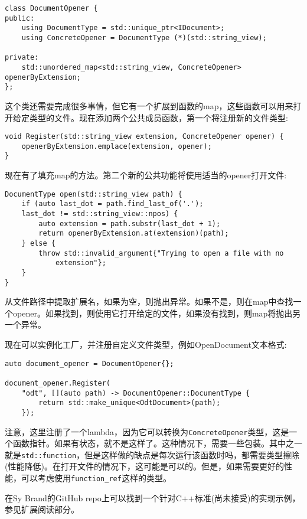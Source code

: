 \begin{lstlisting}[style=styleCXX]
class DocumentOpener {
public:
	using DocumentType = std::unique_ptr<IDocument>;
	using ConcreteOpener = DocumentType (*)(std::string_view);

private:
	std::unordered_map<std::string_view, ConcreteOpener> openerByExtension;
};
\end{lstlisting}

这个类还需要完成很多事情，但它有一个扩展到函数的map，这些函数可以用来打开给定类型的文件。现在添加两个公共成员函数，第一个将注册新的文件类型:

\begin{lstlisting}[style=styleCXX]
void Register(std::string_view extension, ConcreteOpener opener) {
	openerByExtension.emplace(extension, opener);
}
\end{lstlisting}

现在有了填充map的方法。第二个新的公共功能将使用适当的opener打开文件:

\begin{lstlisting}[style=styleCXX]
DocumentType open(std::string_view path) {
	if (auto last_dot = path.find_last_of('.');
	last_dot != std::string_view::npos) {
		auto extension = path.substr(last_dot + 1);
		return openerByExtension.at(extension)(path);
	} else {
		throw std::invalid_argument{"Trying to open a file with no
			extension"};
	}
}
\end{lstlisting}

从文件路径中提取扩展名，如果为空，则抛出异常。如果不是，则在map中查找一个opener。如果找到，则使用它打开给定的文件，如果没有找到，则map将抛出另一个异常。

现在可以实例化工厂，并注册自定义文件类型，例如OpenDocument文本格式:

\begin{lstlisting}[style=styleCXX]
auto document_opener = DocumentOpener{};

document_opener.Register(
	"odt", [](auto path) -> DocumentOpener::DocumentType {
		return std::make_unique<OdtDocument>(path);
	});
\end{lstlisting}

注意，这里注册了一个lambda，因为它可以转换为\texttt{ConcreteOpener}类型，这是一个函数指针。如果有状态，就不是这样了。这种情况下，需要一些包装。其中之一就是\texttt{std::function}，但是这样做的缺点是每次运行该函数时吗，都需要类型擦除(性能降低)。在打开文件的情况下，这可能是可以的。但是，如果需要更好的性能，可以考虑使用\texttt{function\_ref}这样的类型。

在Sy Brand的GitHub repo上可以找到一个针对C++标准(尚未接受)的实现示例，参见扩展阅读部分。

